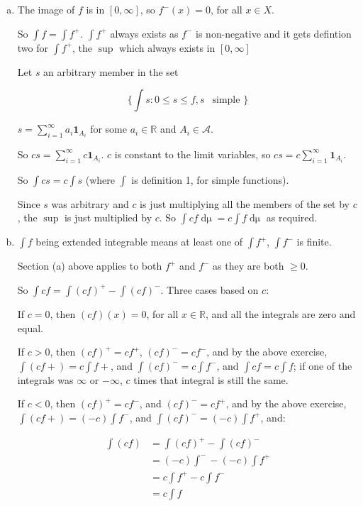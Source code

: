 \documentclass[11pt,oneside]{article}
\numberwithin{equation}{section}
\theoremstyle{definition}
\def\RR{\mathbb{R}}
\def\fancyA{\mathscr{A}}
\def\one{\mathbf{1}}
\begin{document}
\begin{solution}
\begin{enumerate}[(a)]
\item
  The image of $f$ is in $[0, \infty]$, so $f^-(x) = 0$, for all $x \in X$.

    So $\int f = \int f^+$.  $\int f^+$ always exists as $f^-$ is non-negative and it gets
    defintion two for $\int f^+$, the $\sup$ which always exists in $[0, \infty]$

    Let $s$ an arbitrary member in the set

    \[
    \{  \int s : 0 \leq s \leq f, s \ \  \textrm{ simple } \}
    \]

    $ s = \sum \limits_{i = 1}^\infty a_i \one_{A_i} $ for some $a_i \in \RR$ and $A_i \in \fancyA$.

    So $cs = \sum \limits_{i = 1} ^ \infty c \one_{A_i}$.  $c$ is constant to the limit variables,
    so $cs = c \sum \limits_{i=1} ^ \infty \one_{A_i}$.

    So $\int cs = c \int s$ (where $\int$ is definition 1, for simple functions).

    Since $s$ was arbitrary and $c$ is just multiplying all the members of the set by $c$,
    the $\sup$ is just multiplied by $c$.  So $\int cf \mathop{d \mu} = c \int f \mathop{d \mu}$ as required.  
    

  
\item
  $\int f$ being extended integrable means at least one of $\int f^+$, $\int f^-$ is finite.

  Section (a) above applies to both $f^+$ and $f^-$ as they are both $ \geq 0$.

  So $\int cf = \int (cf)^+ - \int(cf)^-$.  Three cases based on $c$:

  If $c = 0$, then $(cf)(x) = 0$, for all $x \in \RR$, and all the integrals are zero and equal.

  If $c > 0$, then $(cf)^+ = cf^+$, $(cf)^- = cf^-$, and by the above exercise,
  $\int (cf+) = c \int f+$, and $\int (cf)^- = c \int f^-$, and $\int cf = c \int f$; if one
  of the integrals was $\infty$ or $- \infty$, $c$ times that integral is still the same.

  If $c < 0$, then $(cf)^+ = cf^-$, and $(cf)^- = cf^+$, and by the
  above exercise, $\int (cf+) = (-c) \int f^-$,
  and $\int (cf)^- = (-c) \int f^+$, and:

  \begin{align*}
    \int (cf) & = \int(cf) ^ + - \int(cf)^- \\
    & = (-c) \int^- - (-c) \int f^+ \\
    & = c \int f^+ - c \int f^- \\
    & = c \int f
  \end{align*}


\end{enumerate}
\end{solution}
\end{document}
